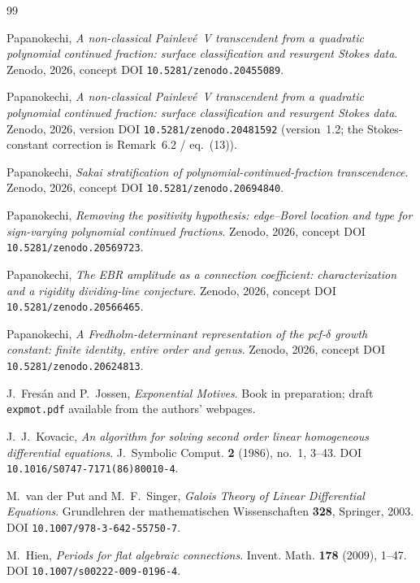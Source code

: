 \documentclass[11pt,reqno]{amsart}
\renewcommand{\_}{\vquadorigunderscore\allowbreak}
\theoremstyle{plain}
\theoremstyle{definition}
\begin{document}
\begin{thebibliography}{99}

Papanokechi,
\emph{A non-classical Painlev\'e~V transcendent from a quadratic polynomial continued fraction:
surface classification and resurgent Stokes data}.
Zenodo, 2026, concept DOI \texttt{10.5281/zenodo.20455089}.

Papanokechi,
\emph{A non-classical Painlev\'e~V transcendent from a quadratic polynomial continued fraction:
surface classification and resurgent Stokes data}.
Zenodo, 2026, version DOI \texttt{10.5281/zenodo.20481592} (version~1.2; the Stokes-constant
correction is Remark~6.2 / eq.~(13)).

Papanokechi,
\emph{Sakai stratification of polynomial-continued-fraction transcendence}.
Zenodo, 2026, concept DOI \texttt{10.5281/zenodo.20694840}.

Papanokechi,
\emph{Removing the positivity hypothesis: edge--Borel location and type for sign-varying polynomial
continued fractions}.
Zenodo, 2026, concept DOI \texttt{10.5281/zenodo.20569723}.

Papanokechi,
\emph{The EBR amplitude as a connection coefficient: characterization and a rigidity dividing-line
conjecture}.
Zenodo, 2026, concept DOI \texttt{10.5281/zenodo.20566465}.

Papanokechi,
\emph{A Fredholm-determinant representation of the pcf-$\delta$ growth constant: finite identity,
entire order and genus}.
Zenodo, 2026, concept DOI \texttt{10.5281/zenodo.20624813}.

J.~Fres\'an and P.~Jossen,
\emph{Exponential Motives}.
Book in preparation; draft \texttt{expmot.pdf} available from the authors' webpages.

J.~J.~Kovacic,
\emph{An algorithm for solving second order linear homogeneous differential equations}.
J.~Symbolic Comput. \textbf{2} (1986), no.~1, 3--43.
DOI \texttt{10.1016/S0747-7171(86)80010-4}.

M.~van der Put and M.~F.~Singer,
\emph{Galois Theory of Linear Differential Equations}.
Grundlehren der mathematischen Wissenschaften \textbf{328}, Springer, 2003.
DOI \texttt{10.1007/978-3-642-55750-7}.

M.~Hien,
\emph{Periods for flat algebraic connections}.
Invent. Math. \textbf{178} (2009), 1--47.
DOI \texttt{10.1007/s00222-009-0196-4}.


\end{thebibliography}
\end{document}
